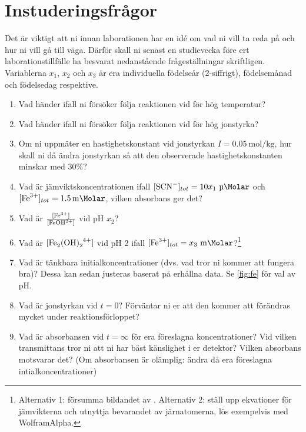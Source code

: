 \section{Instuderingsfrågor}
\label{sec:instudering}
Det är viktigt att ni innan laborationen har en idé om vad ni vill ta
reda på och hur ni vill gå till väga. Därför skall ni senast en studievecka
före ert laborationstillfälle ha besvarat nedanstående frågeställningar
skriftligen.
Variablerna $x_1$, $x_2$ och $x_3$
är era individuella födelseår
(2-siffrigt), födelsemånad och födelsedag respektive.

\begin{enumerate}
\item Vad händer ifall ni försöker följa reaktionen vid för hög
  temperatur?
\item Vad händer ifall ni försöker följa reaktionen vid för hög
  jonstyrka?
\item Om ni uppmäter en hastighetskonstant vid jonstyrkan $I =
  \SI{0.05}{\mole\per\kg}$, hur skall ni då ändra jonstyrkan så att den
  observerade hastighetskonstanten minskar med 30\%?
\item Vad är jämviktskoncentrationen  ifall
  $[\ce{SCN^{-}}]_{tot} = 10 x_1~\si{\micro\Molar}$ och 
  $[\ce{Fe^{3+}}]_{tot} = \SI{1.5}{\milli\Molar}$, vilken absorbans ger det?
\item Vad är $\frac{[\ce{Fe^{3+}}]}{[\ce{FeOH^{2+}}]}$ vid pH $x_2$?
\item Vad är $[\ce{Fe_2(OH)_2^{4+}}]$ vid pH 2 ifall
  $[\ce{Fe^{3+}}]_{tot} = x_3~\si{\milli\Molar}$?\footnote{
Alternativ 1: försumma bildandet av . Alternativ 2: ställ upp ekvationer
för jämvikterna och utnyttja bevarandet av järnatomerna, lös
exempelvis med WolframAlpha.
}
\item Vad är tänkbara initialkoncentrationer (dvs. vad tror ni kommer att
  fungera bra)? Dessa kan sedan justeras baserat på erhållna data. Se
  \cref{fig:fe} för val av pH.
\item Vad är jonstyrkan vid $t=0$? Förväntar ni er att den kommer att
  förändras mycket under reaktionsförloppet?
\item Vad är absorbansen vid $t=\infty$ för era föreslagna
  koncentrationer? Vid vilken transmittans tror ni att ni har bäst
  känslighet i er detektor? Vilken absorbans motsvarar det? (Om
  absorbansen är olämplig: ändra då era föreslagna intialkoncentrationer)
\end{enumerate}

